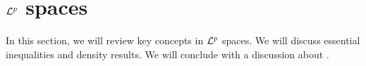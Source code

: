 \section{${\mathcal {L}^p}$ spaces}
\label{section:appendix:lp}

In this section, we will review key concepts in ${\mathcal {L}^p}$ spaces. We will discuss essential inequalities and density results. 
We will conclude with a discussion about .




